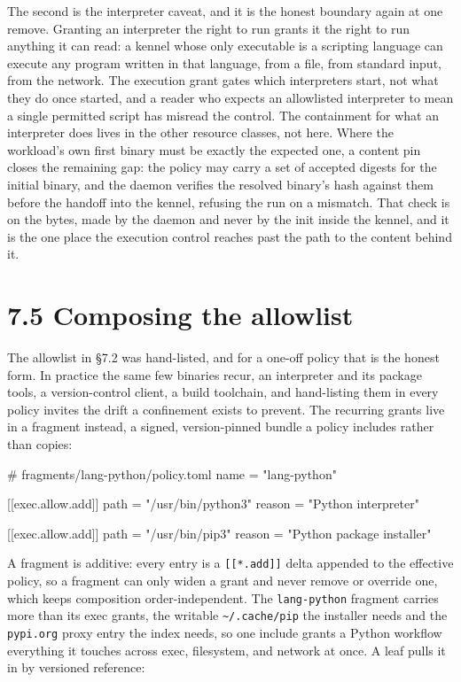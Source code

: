 The second is the interpreter caveat, and it is the honest boundary
again at one remove. Granting an interpreter the right to run grants it
the right to run anything it can read: a kennel whose only executable is
a scripting language can execute any program written in that language,
from a file, from standard input, from the network. The execution grant
gates which interpreters start, not what they do once started, and a
reader who expects an allowlisted interpreter to mean a single permitted
script has misread the control. The containment for what an interpreter
does lives in the other resource classes, not here. Where the workload's
own first binary must be exactly the expected one, a content pin closes
the remaining gap: the policy may carry a set of accepted digests for
the initial binary, and the daemon verifies the resolved binary's hash
against them before the handoff into the kennel, refusing the run on a
mismatch. That check is on the bytes, made by the daemon and never by
the init inside the kennel, and it is the one place the execution
control reaches past the path to the content behind it.

\hypertarget{composing-the-allowlist}{%
\section{7.5 Composing the allowlist}\label{composing-the-allowlist}}

The allowlist in §7.2 was hand-listed, and for a one-off policy that is
the honest form. In practice the same few binaries recur, an interpreter
and its package tools, a version-control client, a build toolchain, and
hand-listing them in every policy invites the drift a confinement exists
to prevent. The recurring grants live in a fragment instead, a signed,
version-pinned bundle a policy includes rather than copies:

\begin{kennelcode}
# fragments/lang-python/policy.toml
name = "lang-python"

[[exec.allow.add]]
path = "/usr/bin/python3"
reason = "Python interpreter"

[[exec.allow.add]]
path = "/usr/bin/pip3"
reason = "Python package installer"
\end{kennelcode}

A fragment is additive: every entry is a \texttt{{[}{[}*.add{]}{]}}
delta appended to the effective policy, so a fragment can only widen a
grant and never remove or override one, which keeps composition
order-independent. The \texttt{lang-python} fragment carries more than
its exec grants, the writable \texttt{\textasciitilde{}/.cache/pip} the
installer needs and the \texttt{pypi.org} proxy entry the index needs,
so one include grants a Python workflow everything it touches across
exec, filesystem, and network at once. A leaf pulls it in by versioned
reference:

